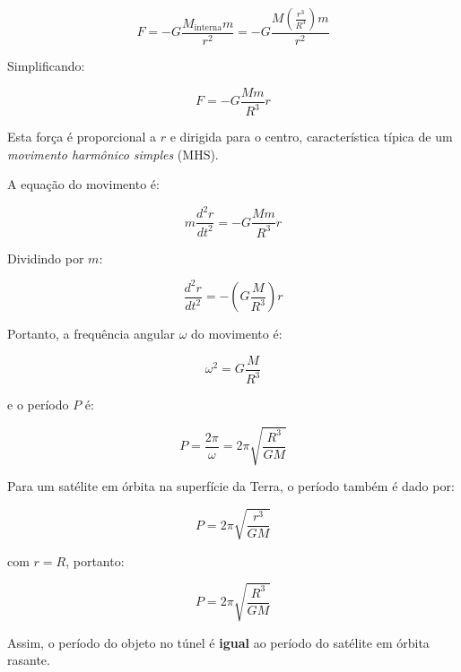 \documentclass[a4paper,12pt]{article}
\begin{document}
\begin{flushleft}
\begin{equation}
F = - G \frac{M_{\text{interna}} m}{r^2} = -G \frac{M \left( \frac{r^3}{R^3} \right) m}{r^2}
\end{equation}

Simplificando:

\begin{equation}
F = -G \frac{M m}{R^3} r
\end{equation}

Esta força é proporcional a \( r \) e dirigida para o centro, característica típica de um \textit{movimento harmônico simples} (MHS).

A equação do movimento é:

\begin{equation}
\boxed{
m \frac{d^2r}{dt^2} = -G \frac{M m}{R^3} r
}
\end{equation}

Dividindo por \( m \):

\begin{equation}
\frac{d^2r}{dt^2} = -\left( G \frac{M}{R^3} \right) r
\end{equation}

Portanto, a frequência angular \( \omega \) do movimento é:

\begin{equation}
\omega^2 = G \frac{M}{R^3}
\end{equation}

e o período \( P \) é:

\begin{equation}
P = \frac{2\pi}{\omega} = 2\pi \sqrt{\frac{R^3}{G M}}
\end{equation}

\vspace{0.5cm}

Para um satélite em órbita na superfície da Terra, o período também é dado por:

\begin{equation}
P = 2\pi \sqrt{\frac{r^3}{G M}}
\end{equation}

com \( r = R \), portanto:

\begin{equation}
P = 2\pi \sqrt{\frac{R^3}{G M}}
\end{equation}

Assim, o período do objeto no túnel é \textbf{igual} ao período do satélite em órbita rasante.

\vspace{0.5cm}


\end{flushleft}
\end{document}
